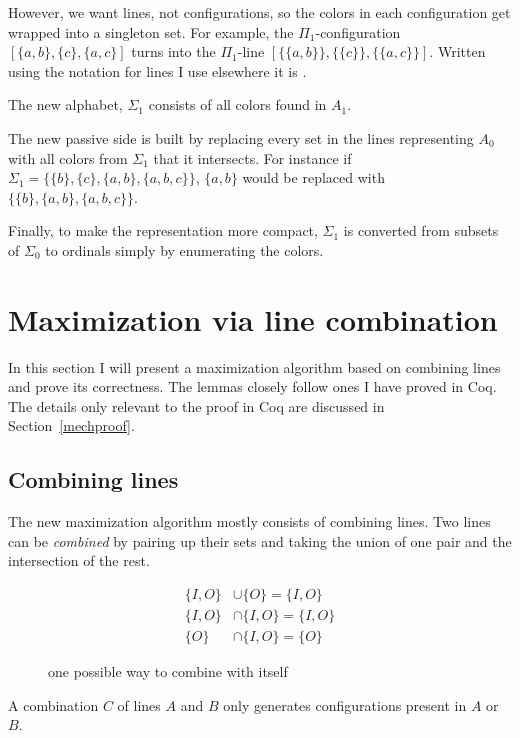 \documentclass[english, 12pt, a4paper, sci, a-1b, online]{aaltothesis}
\begin{document}
However, we want lines, not configurations, so the colors in each configuration get wrapped into a singleton set. For example, the $\Pi_1$-configuration $[\{a, b\}, \{c\}, \{a, c\}]$ turns into the $\Pi_1$-line $[\{\{a, b\}\}, \{\{c\}\}, \{\{a, c\}\}]$. Written using the notation for lines I use elsewhere it is .

The new alphabet, $\Sigma_1$ consists of all colors found in $A_1$.

The new passive side is built by replacing every set in the lines representing $A_0$ with all colors from $\Sigma_1$ that it intersects. For instance if $\Sigma_1 = \{\{b\}, \{c\}, \{a, b\}, \{a, b, c\}\}$, $\{a, b\}$ would be replaced with $\{\{b\}, \{a, b\}, \{a, b, c\}\}$.

Finally, to make the representation more compact, $\Sigma_1$ is converted from subsets of $\Sigma_0$ to ordinals simply by enumerating the colors.


\section{Maximization via line combination}\label{nlproof}

In this section I will present a maximization algorithm based on combining lines and prove its correctness. The lemmas closely follow ones I have proved in Coq. The details only relevant to the proof in Coq are discussed in Section~\ref{mechproof}.

\subsection{Combining lines}

The new maximization algorithm mostly consists of combining lines. Two lines can be \emph{combined} by pairing up their sets and taking the union of one pair and the intersection of the rest.

\begin{figure}[h]
\begin{align*}
  \{I,O\} &\cup \{O\} = \{I, O\} \\
  \{I,O\} &\cap \{I,O\} = \{I, O\} \\
  \{O\} &\cap \{I, O\} = \{O\}
\end{align*}
\caption{one possible way to combine  with itself}
\end{figure}

\begin{theorem}
\label{sound}
A combination $C$ of lines $A$ and $B$ only generates configurations present in $A$ or $B$.
\end{theorem}
\end{document}
